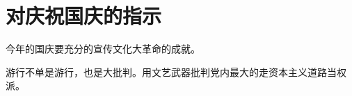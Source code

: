 \section[对庆祝国庆的指示（一九六七年九月）]{对庆祝国庆的指示}


今年的国庆要充分的宣传文化大革命的成就。


游行不单是游行，也是大批判。用文艺武器批判党内最大的走资本主义道路当权派。

